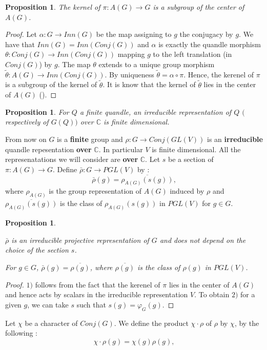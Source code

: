 \documentclass[12pt, reqno]{amsart}
\newtheorem{proposition}[theorem]{Proposition}
\newcommand{\C}{ {\mathbb C} }
\begin{document}
 \begin{proposition}
The kernel of $\pi : A(G)\to G$ is a subgroup of the center of $A(G)$.
\end{proposition}
\begin{proof}
Let $\alpha :G \to Inn(G)$ be the map assigning to $g$ the conjugacy by $g$. We have that $Inn(G)=Inn(Conj(G))$ and $\alpha$ is exactly the quandle morphism $\theta :Conj(G)\to Inn(Conj(G))$ mapping  $g$ to the left translation (in $Conj(G)$) by $g$. The map $\theta$ extends to a unique group morphism $\tilde{\theta} :A(G) \to Inn(Conj(G))$. By uniqueness $\tilde{\theta}=\alpha\circ \pi $. Hence, the kerenel of $\pi$ is a subgroup of the kernel of $\tilde{\theta}$. It is know that the kernel of $\tilde{\theta}$ lies in the center of $A(G)$ (\cite{EM}).
\end{proof}
\begin{proposition}{\cite{GQ}}
For $Q$ a finite quandle, an irreducible representation of $Q$ $($respectively of $G(Q)$$)$ over $\mathbb{C}$ is finite dimensional.
\end{proposition}
From now on $G$ is a \textbf{finite} group and $\rho : G \to Conj(GL(V))$ is an \textbf{irreducible} quandle repesentation \textbf{over} $\C$. In particular $V$ is finite dimensional. All the represenatations we will consider are \textbf{over} $\mathbb{C}$. Let $s$ be a section of $\pi:A(G)\to G$. Define $\bar{\rho}: G \to PGL(V)$ by :  
$$\bar{\rho}(g)=\overline{\rho_{A(G)}(s(g))},$$
where $\rho_{A(G)}$ is the group representation of $A(G)$ induced by $\rho$ and $\overline{\rho_{A(G)}(s(g))}$ is the class of $\rho_{A(G)}(s(g))$ in $PGL(V)$ for $g\in G$. 
\begin{proposition}\label{pro}
\item[1)] $\bar{\rho}$ is an irreducible projective representation of $G$ and does not depend on the choice of the section $s$.
\item[2)] For $g\in G$, $\bar{\rho}(g)=\overline{\rho(g)}$, where $\overline{\rho(g)}$ is the class of $\rho(g)$ in $PGL(V)$.
 \end{proposition}
\begin{proof}
$1)$ follows from the fact that the kerenel of $\pi$ lies in the center of $A(G)$ and hence acts by scalars in the irreducible representation $V$. To obtain $2)$ for a given $g$, we can take $s$ such that $s(g)=\varphi_G(g)$.
\end{proof}
Let $\chi$ be a character of $Conj(G)$. We define the product $\chi \cdot \rho$ of $\rho$  by $\chi$, by the following : 
$$ \chi \cdot \rho (g)=\chi(g) \rho(g),$$
\end{document}
